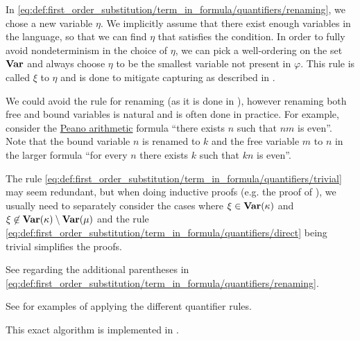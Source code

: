 \begin{definition}
\begin{thmenum}
    In \eqref{eq:def:first_order_substitution/term_in_formula/quantifiers/renaming}, we chose a new variable \( \eta \). We implicitly assume that there exist enough variables in the language, so that we can find \( \eta \) that satisfies the condition. In order to fully avoid nondeterminism in the choice of \( \eta \), we can pick a well-ordering on the set \( \operatorname{\mathbf{Var}} \) and always choose \( \eta \) to be the smallest variable not present in \( \varphi \). This rule is called  \( \xi \) to \( \eta \) and is done to mitigate capturing as described in .

    We could avoid the rule for renaming (as it is done in \cite[def. 15.25]{OpenLogicFull}), however renaming both free and bound variables is natural and is often done in practice. For example, consider the \hyperref[def:peano_arithmetic]{Peano arithmetic} formula \enquote{there exists \( n \) such that \( nm \) is even}. Note that the bound variable \( n \) is renamed to \( k \) and the free variable \( m \) to \( n \) in the larger formula \enquote{for every \( n \) there exists \( k \) such that \( kn \) is even}.

    The rule \eqref{eq:def:first_order_substitution/term_in_formula/quantifiers/trivial} may seem redundant, but when doing inductive proofs (e.g. the proof of ), we usually need to separately consider the cases where \( \xi \in \operatorname{\mathbf{Var}}(\kappa) \) and \( \xi \not\in \operatorname{\mathbf{Var}}(\kappa) \setminus \operatorname{\mathbf{Var}}(\mu) \) and the rule \eqref{eq:def:first_order_substitution/term_in_formula/quantifiers/direct} being trivial simplifies the proofs.

    See  regarding the additional parentheses in \eqref{eq:def:first_order_substitution/term_in_formula/quantifiers/renaming}.

    See  for examples of applying the different quantifier rules.

    This exact algorithm is implemented in \cite{code}.
  \end{thmenum}
\end{definition}

